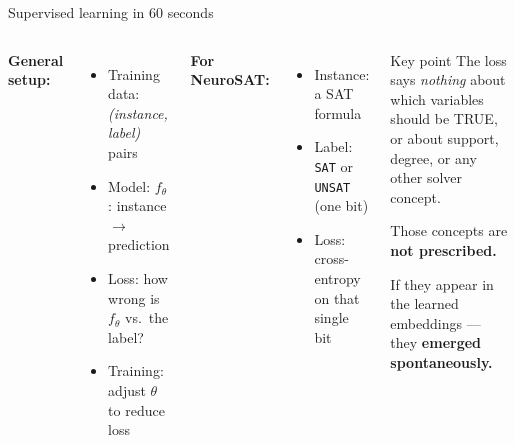 \documentclass[aspectratio=169,10pt,dvipsnames]{beamer}
\begin{document}
\begin{frame}{Supervised learning in 60 seconds}
\begin{columns}[T]
\textbf{General setup:}
\begin{itemize}
  \item Training data: \textit{(instance, label)} pairs
  \item Model: $f_\theta$: instance $\to$ prediction
  \item Loss: how wrong is $f_\theta$ vs.\ the label?
  \item Training: adjust $\theta$ to reduce loss
\end{itemize}

\bigskip
\textbf{For NeuroSAT:}
\begin{itemize}
  \item Instance: a SAT formula
  \item Label: \texttt{SAT} or \texttt{UNSAT} (one bit)
  \item Loss: cross-entropy on that single bit
\end{itemize}

\begin{block}{Key point}
\small
The loss says \emph{nothing} about which variables should be TRUE, or about support,
degree, or any other solver concept.

\medskip
Those concepts are \textbf{not prescribed.}

\medskip
If they appear in the learned embeddings — they \textbf{emerged spontaneously.}
\end{block}
\end{columns}
\end{frame}
\end{document}
